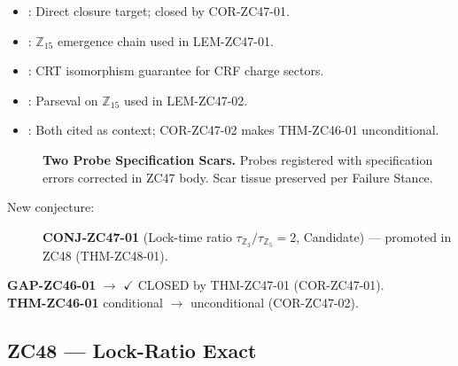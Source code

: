 \documentclass[12pt, a4paper]{article}
\begin{document}
\begin{inheritbox}[title={ZC47 Backward Inheritance}]
\begin{itemize}[leftmargin=1.5em]
\item {}: Direct closure
  target; closed by COR-ZC47-01.
\item {}: $\mathbb{Z}_{15}$ emergence
  chain used in LEM-ZC47-01.
\item {}: CRT isomorphism guarantee for
  CRF charge sectors.
\item {}: Parseval on $\mathbb{Z}_{15}$
  used in LEM-ZC47-02.
\item {}: Both cited as context;
  COR-ZC47-02 makes THM-ZC46-01 unconditional.
\end{itemize}
\end{inheritbox}

\begin{correctionbox}[title={ZC47 Forward Corrections / Phase Misalignments}]
\begin{description}
\item[] \textbf{Two Probe Specification Scars.}
  Probes registered with specification errors corrected in ZC47 body.
  Scar tissue preserved per Failure Stance.
\item[New conjecture:] \textbf{CONJ-ZC47-01} (Lock-time ratio
  $\tau_{\mathbb{Z}_3}/\tau_{\mathbb{Z}_5} = 2$, Candidate) ---
  promoted in ZC48 (THM-ZC48-01).
\end{description}
\end{correctionbox}

\begin{conmapbox}[title={ZC47 Closure Records}]
\textbf{GAP-ZC46-01} $\to$ \textcolor{crfgreen}{$\checkmark$ CLOSED}
by THM-ZC47-01 (COR-ZC47-01).\\
\textbf{THM-ZC46-01} conditional $\to$
\textcolor{crfgreen}{unconditional} (COR-ZC47-02).
\end{conmapbox}

\subsection{ZC48 --- Lock-Ratio Exact}
\end{document}
